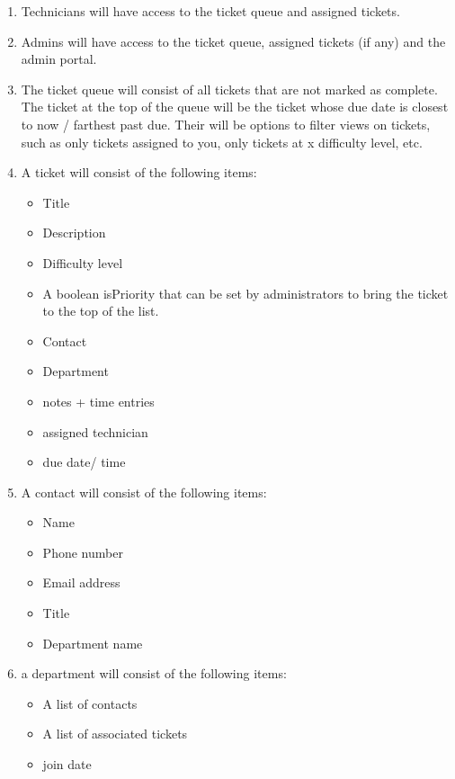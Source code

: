 \documentclass[letterpaper]{article}
\begin{document}
\begin{enumerate}
	\item Technicians will have access to the ticket queue and assigned tickets.
	\item Admins will have access to the ticket queue, assigned tickets (if any) and the admin portal.
	\item The ticket queue will consist of all tickets that are not marked as complete. The ticket at the top of the queue will be the ticket whose due date is closest to now / farthest past due. Their will be options to filter views on tickets, such as only tickets assigned to you, only tickets at x difficulty level, etc.
	\item A  ticket will consist of the following items:
	      \begin{itemize}
		      \item Title
		      \item Description
		      \item Difficulty level
		      \item A boolean isPriority that can be set by administrators to bring the ticket to the top of the list.
		      \item Contact
		      \item Department
		      \item notes + time entries
		      \item assigned technician
		      \item due date/ time
	      \end{itemize}
	\item A  contact will consist of the following items:
	      \begin{itemize}
		      \item Name
		      \item Phone number
		      \item Email address
		      \item Title
		      \item Department name
	      \end{itemize}
	\item a  department will consist of the following items:
	      \begin{itemize}
		      \item A list of contacts
		      \item A list of associated tickets
		      \item join date
	      \end{itemize}

\end{enumerate}
\end{document}
